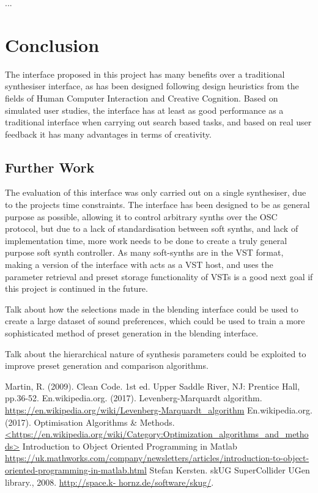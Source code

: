 \documentclass[11pt, oneside]{report}   	%
\begin{document}
...

\chapter{Conclusion}
The interface proposed in this project has many benefits over a traditional synthesiser interface, as has been designed following design heuristics from the fields of Human Computer Interaction and Creative Cognition. Based on simulated user studies, the interface has at least as good performance as a traditional interface when carrying out search based tasks, and based on real user feedback it has many advantages in terms of creativity.
\section{Further Work}
The evaluation of this interface was only carried out on a single synthesiser, due to the projects time constraints. The interface has been designed to be as general purpose as possible, allowing it to control arbitrary synths over the OSC protocol, but due to a lack of standardisation between soft synths, and lack of implementation time, more work needs to be done to create a truly general purpose soft synth controller. As many soft-synths are in the VST format, making a version of the interface with acts as a VST host, and uses the parameter retrieval and preset storage functionality of VSTs is a good next goal if this project is continued in the future.

Talk about how the selections made in the blending interface could be used to create a large dataset of sound preferences, which could be used to train a more sophisticated method of preset generation in the blending interface.

Talk about the hierarchical nature of synthesis parameters could be exploited to improve preset generation and comparison algorithms. 
\begin{thebibliography}{9}
\singlespacing
{}
Martin, R. (2009). Clean Code. 1st ed. Upper Saddle River, NJ: Prentice Hall, pp.36-52.
En.wikipedia.org. (2017). Levenberg-Marquardt algorithm. \\
\url{https://en.wikipedia.org/wiki/Levenberg-Marquardt_algorithm}
En.wikipedia.org. (2017). Optimisation Algorithms \& Methods.
\url{<https://en.wikipedia.org/wiki/Category:Optimization_algorithms_and_methods>}
Introduction to Object Oriented Programming in Matlab\\
\url{https://uk.mathworks.com/company/newsletters/articles/introduction-to-object-oriented-programming-in-matlab.html}
Stefan Kersten. skUG SuperCollider UGen library., 2008. \url{http://space.k- hornz.de/software/skug/}.
\end{thebibliography}
\end{document}
